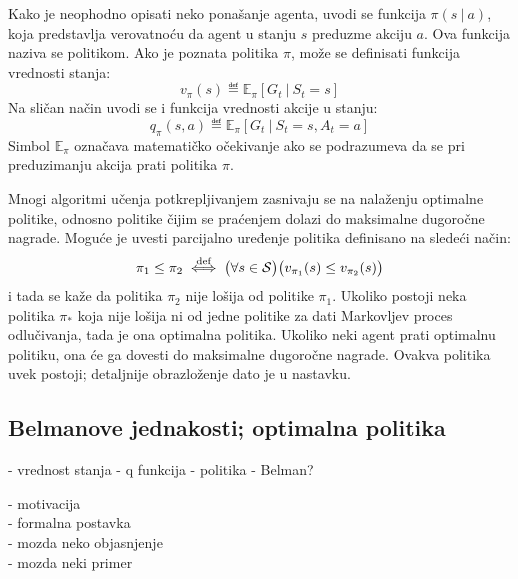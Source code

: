 Kako je neophodno opisati neko ponašanje agenta, uvodi se funkcija $\pi(s~|~a)$, koja predstavlja verovatnoću da agent u stanju $s$ preduzme akciju $a$. Ova funkcija naziva se politikom. Ako je poznata politika $\pi$, može se definisati funkcija vrednosti stanja:
\begin{equation}
	v_{\pi}(s) \eqdef \mathbb{E}_{\pi}[G_t~|~S_t=s]
\end{equation}
Na sličan način uvodi se i funkcija vrednosti akcije u stanju:
\begin{equation}
	q_{\pi}(s, a) \eqdef \mathbb{E}_{\pi}[G_t~|~S_t=s, A_t=a]
\end{equation}
Simbol $\mathbb{E}_{\pi}$ označava matematičko očekivanje ako se podrazumeva da se pri preduzimanju akcija prati politika $\pi$.
\par 
Mnogi algoritmi učenja potkrepljivanjem zasnivaju se na nalaženju optimalne politike, odnosno politike čijim se praćenjem dolazi do maksimalne dugoročne nagrade. Moguće je uvesti parcijalno uređenje politika definisano na sledeći način:
\begin{equation}
	\pi_1 \leq \pi_2 \stackrel{\text{def}}{\iff} \big(\forall s \in \mathcal{S}\big) \big( v_{\pi_1}(s) \leq v_{\pi_2}(s)\big)
\end{equation}
i tada se kaže da politika $\pi_2$ nije lošija  od politike $\pi_1$. Ukoliko postoji neka politika $\pi_*$ koja nije lošija ni od jedne politike za dati Markovljev proces odlučivanja, tada je ona optimalna politika. Ukoliko neki agent prati optimalnu politiku, ona će ga dovesti do maksimalne dugoročne nagrade. Ovakva politika uvek postoji; detaljnije obrazloženje dato je u nastavku.

\subsection{Belmanove jednakosti; optimalna politika}


- vrednost stanja
- q funkcija
- politika
- Belman?


- motivacija \\
- formalna postavka \\
- mozda neko objasnjenje \\
- mozda neki primer \\